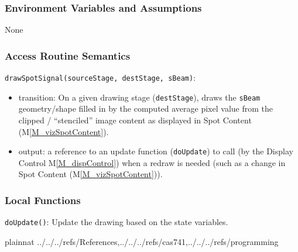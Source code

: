 \documentclass[12pt, titlepage]{article}
\newcommand{\mref}[1]{M\ref{#1}}
\newcommand{\mrefp}[1]{(\mref{#1})}
\newcommand{\code}[1]{\texttt{#1}}
\begin{document}
\subsubsection{Environment Variables and Assumptions}
None

\subsubsection{Access Routine Semantics}

\noindent \code{drawSpotSignal(sourceStage, destStage, sBeam)}:
\begin{itemize}
  \item transition: On a given drawing stage (\code{destStage}),
  draws the \code{sBeam} geometry/shape filled in by the computed average pixel value
  from the clipped / ``stenciled'' image content as displayed in
  Spot Content \mrefp{M_vizSpotContent}.
\item output: a reference to an update function (\code{doUpdate})
  to call (by the Display Control \mref{M_dispControl})
  when a redraw is needed (such as a change in Spot Content \mrefp{M_vizSpotContent}).
\end{itemize}

\subsubsection{Local Functions}
\code{doUpdate()}: Update the drawing based on the state variables.

\newpage






 {plainnat}
 {../../../refs/References,../../../refs/cas741,../../../refs/programming}

\newpage
\end{document}

